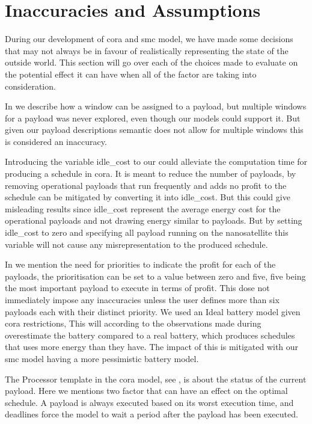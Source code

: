 \section{Inaccuracies and Assumptions}\label{sec:in_and_ass}
During our development of \gls{cora} and \gls{smc} model, we have made some decisions that may not always be in favour of realistically representing the state of the outside world. This section will go over each of the choices made to evaluate on the potential effect it can have when all of the factor are taking into consideration.

In  we describe how a window can be assigned to a payload, but multiple windows for a payload was never explored, even though our models could support it. But given our payload descriptions semantic does not allow for multiple windows this is considered an inaccuracy.

Introducing the variable idle\_cost to our  could alleviate the computation time for producing a schedule in \gls{cora}. It is meant to reduce the number of payloads, by removing operational payloads that run frequently and adds no profit to the schedule can be mitigated by converting it into idle\_cost. But this could give misleading results since idle\_cost represent the average energy cost for the operational payloads and not drawing energy similar to payloads. But by setting idle\_cost to zero and specifying all payload running on the nanosatellite this variable will not cause any misrepresentation to the produced schedule.

In  we mention the need for priorities to indicate the profit for each of the payloads, the prioritisation can be set to a value between zero and five, five being the most important payload to execute in terms of profit. This dose not immediately impose any inaccuracies unless the user defines more than six payloads each with their distinct priority.
We used an Ideal battery model given \gls{cora} restrictions, This will according to the observations made during  overestimate the battery compared to a real battery, which produces schedules that uses more energy than they have. The impact of this is mitigated with our \gls{smc} model having a more pessimistic battery model.

The Processor template in the \gls{cora} model, see , is about the status of the current payload. Here we mentions two factor that can have an effect on the optimal schedule. A payload is always executed based on its worst execution time, and deadlines force the model to wait a period after the payload has been executed. 

